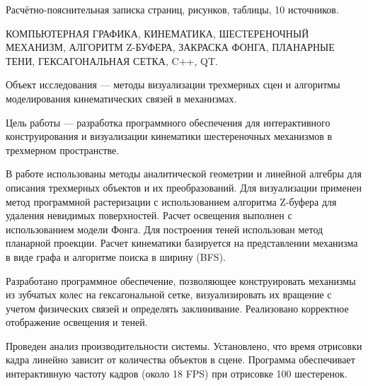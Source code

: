 Расчётно-пояснительная записка \pageref{LastPage} страниц,  рисунков,
 таблицы, 10 источников.

\noindent
КОМПЬЮТЕРНАЯ ГРАФИКА, КИНЕМАТИКА, ШЕСТЕРЕНОЧНЫЙ МЕХАНИЗМ, АЛГОРИТМ Z-БУФЕРА, ЗАКРАСКА ФОНГА, ПЛАНАРНЫЕ ТЕНИ, ГЕКСАГОНАЛЬНАЯ СЕТКА, C++, QT.

Объект исследования --- методы визуализации трехмерных сцен и алгоритмы моделирования кинематических связей в механизмах.

Цель работы --- разработка программного обеспечения для интерактивного конструирования и визуализации кинематики шестереночных механизмов в трехмерном пространстве.

В работе использованы методы аналитической геометрии и линейной алгебры для описания трехмерных объектов и их преобразований. Для визуализации применен метод программной растеризации с использованием алгоритма Z-буфера для удаления невидимых поверхностей. Расчет освещения выполнен с использованием модели Фонга. Для построения теней использован метод планарной проекции. Расчет кинематики базируется на представлении механизма в виде графа и алгоритме поиска в ширину (BFS).

Разработано программное обеспечение, позволяющее конструировать механизмы из зубчатых колес на гексагональной сетке, визуализировать их вращение с учетом физических связей и определять заклинивание. Реализовано корректное отображение освещения и теней.

Проведен анализ производительности системы. Установлено, что время отрисовки кадра линейно зависит от количества объектов в сцене. Программа обеспечивает интерактивную частоту кадров (около 18 FPS) при отрисовке 100 шестеренок.
